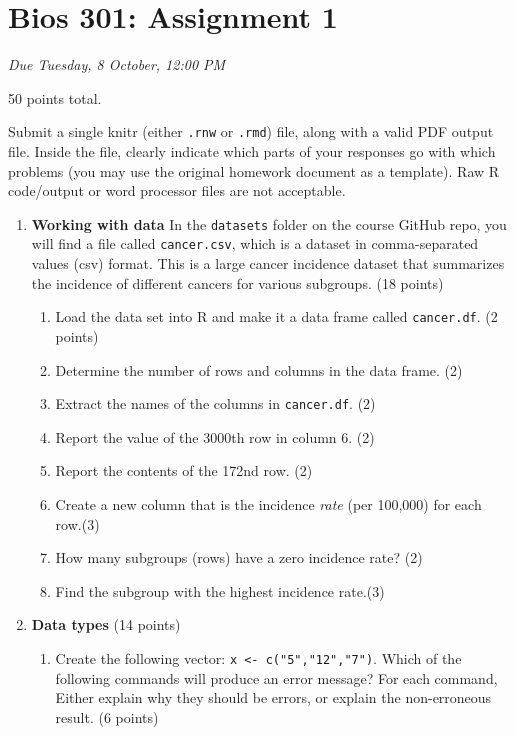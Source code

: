\documentclass[]{article}
\author{}
\date{}
\begin{document}
\section{Bios 301: Assignment 1}

\emph{Due Tuesday, 8 October, 12:00 PM}

50 points total.

Submit a single knitr (either \texttt{.rnw} or \texttt{.rmd}) file,
along with a valid PDF output file. Inside the file, clearly indicate
which parts of your responses go with which problems (you may use the
original homework document as a template). Raw R code/output or word
processor files are not acceptable.

\begin{enumerate}[1.]
\item
  \textbf{Working with data} In the \texttt{datasets} folder on the
  course GitHub repo, you will find a file called \texttt{cancer.csv},
  which is a dataset in comma-separated values (csv) format. This is a
  large cancer incidence dataset that summarizes the incidence of
  different cancers for various subgroups. (18 points)

  \begin{enumerate}[1.]
  \item
    Load the data set into R and make it a data frame called
    \texttt{cancer.df}. (2 points)
  \item
    Determine the number of rows and columns in the data frame. (2)
  \item
    Extract the names of the columns in \texttt{cancer.df}. (2)
  \item
    Report the value of the 3000th row in column 6. (2)
  \item
    Report the contents of the 172nd row. (2)
  \item
    Create a new column that is the incidence \emph{rate} (per 100,000)
    for each row.(3)
  \item
    How many subgroups (rows) have a zero incidence rate? (2)
  \item
    Find the subgroup with the highest incidence rate.(3)
  \end{enumerate}
\item
  \textbf{Data types} (14 points)

  \begin{enumerate}[1.]
  \item
    Create the following vector:
    \texttt{x \textless{}- c("5","12","7")}. Which of the following
    commands will produce an error message? For each command, Either
    explain why they should be errors, or explain the non-erroneous
    result. (6 points)


\end{enumerate}
\end{enumerate}
\end{document}
